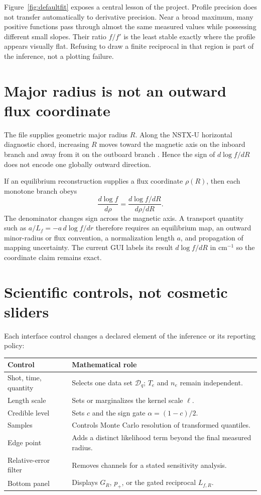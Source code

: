 \documentclass[10pt,twocolumn]{article}
\newcommand{\Data}{\mathcal{D}}
\newcommand{\Te}{T_e}
\newcommand{\nelec}{n_e}
\begin{document}
Figure~\ref{fig:defaultfit} exposes a central lesson of the project.  Profile
precision does not transfer automatically to derivative precision.  Near a
broad maximum, many positive functions pass through almost the same measured
values while possessing different small slopes.  Their ratio $f/f'$ is the
least stable exactly where the profile appears visually flat.  Refusing to
draw a finite reciprocal in that region is part of the inference, not a
plotting failure.

\section{Major radius is not an outward flux coordinate}

The file supplies geometric major radius $R$.  Along the NSTX-U horizontal
diagnostic chord, increasing $R$ moves toward the magnetic axis on the inboard
branch and away from it on the outboard branch \cite{laggner2019}.  Hence the
sign of $d\log f/dR$ does not encode one globally outward direction.

If an equilibrium reconstruction supplies a flux coordinate $\rho(R)$, then
each monotone branch obeys
\begin{equation}
\frac{d\log f}{d\rho}
=\frac{d\log f/dR}{d\rho/dR}.
\label{eq:fluxmap}
\end{equation}
The denominator changes sign across the magnetic axis.  A transport quantity
such as $a/L_f=-a\,d\log f/dr$ therefore requires an equilibrium map, an outward
minor-radius or flux convention, a normalization length $a$, and propagation
of mapping uncertainty.  The current GUI labels its result
$d\log f/dR$ in cm$^{-1}$ so the coordinate claim remains exact.

\section{Scientific controls, not cosmetic sliders}

Each interface control changes a declared element of the inference or its
reporting policy:
\begin{center}
\small
\setlength{\tabcolsep}{3pt}
\begin{tabular}{p{}p{}}
\toprule
Control & Mathematical role\\
\midrule
Shot, time, quantity & Selects one data set $\Data_q$; $\Te$ and $\nelec$ remain independent.\\
Length scale & Sets or marginalizes the kernel scale $\ell$.\\
Credible level & Sets $c$ and the sign gate $\alpha=(1-c)/2$.\\
Samples & Controls Monte Carlo resolution of transformed quantiles.\\
Edge point & Adds a distinct likelihood term beyond the final measured radius.\\
Relative-error filter & Removes channels for a stated sensitivity analysis.\\
Bottom panel & Displays $G_R$, $p_+$, or the gated reciprocal $L_{f,R}$.\\
\bottomrule
\end{tabular}
\end{center}
\end{document}
